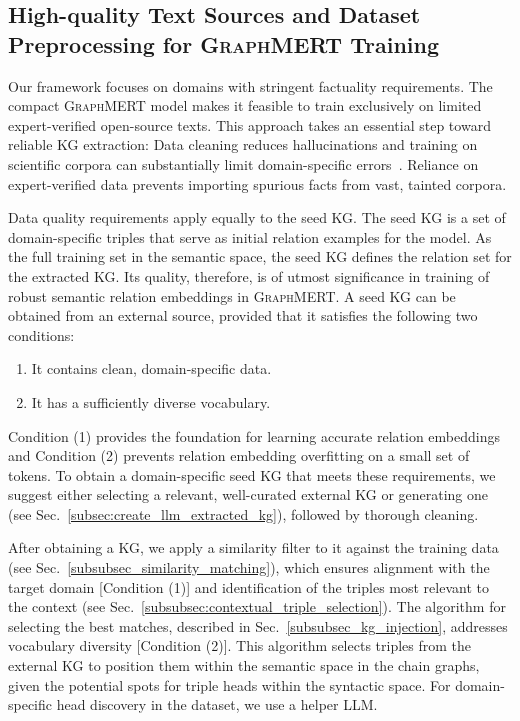 \documentclass[10pt]{article}
\newcommand{\ours}{\textsc{GraphMERT}\xspace}
\begin{document}
\subsection{High-quality Text Sources and Dataset Preprocessing for \ours Training}
\label{subsec:dataset_preprocessing}

Our framework focuses on domains with stringent factuality requirements. The compact \ours model makes it feasible to train exclusively on limited expert-verified open-source texts. This approach takes an essential step toward reliable KG extraction: Data cleaning reduces hallucinations and training on scientific corpora can substantially limit domain-specific errors~\cite{li-etal-2024-dawn}. Reliance on expert-verified data prevents importing spurious facts from vast, tainted corpora.

Data quality requirements apply equally to the seed KG. The seed KG is a set of domain-specific triples that serve as initial relation examples for the model. As the full training set in the semantic space, the seed KG defines the relation set for the extracted KG. Its quality, therefore, is of utmost significance in training of robust semantic relation embeddings in \ours. A seed KG can be obtained from an external source, provided that it satisfies the following two conditions:
\begin{enumerate}
    \item It contains clean, domain-specific data.
    \item It has a sufficiently diverse vocabulary.
\end{enumerate}
Condition (1) provides the foundation for learning accurate relation embeddings and Condition (2) prevents relation embedding overfitting on a small set of tokens. To obtain a domain-specific seed KG that meets these requirements, we suggest either selecting a relevant, well-curated external KG or generating one (see Sec.~\ref{subsec:create_llm_extracted_kg}), followed by thorough cleaning. 

After obtaining a KG, we apply a similarity filter to it against the training data (see Sec.~\ref{subsubsec_similarity_matching}), which ensures alignment with the target domain [Condition (1)] and identification of the triples most relevant to the context (see Sec.~\ref{subsubsec:contextual_triple_selection}). The algorithm for selecting the best matches, described in Sec.~\ref{subsubsec_kg_injection}, addresses vocabulary diversity [Condition (2)]. This algorithm selects triples from the external KG to position them within the semantic space in the chain graphs, given the potential spots for triple heads within the syntactic space.  For domain-specific head discovery in the dataset, we use a helper LLM.
\end{document}
